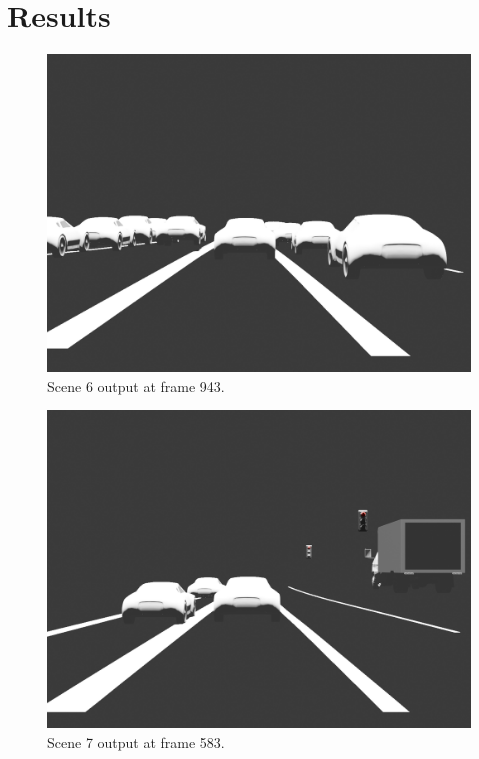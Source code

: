 \newpage
\section{Results}\label{app:results}

\begin{figure}[H]
  \centering
  \includegraphics[width=0.95\linewidth]{images/results/scene6_943.png}
  \caption{Scene 6 output at frame 943.}
\end{figure}
\begin{figure}[H]
  \centering
  \includegraphics[width=0.95\linewidth]{images/results/scene7_frame583.png}
  \caption{Scene 7 output at frame 583.}
\end{figure}
